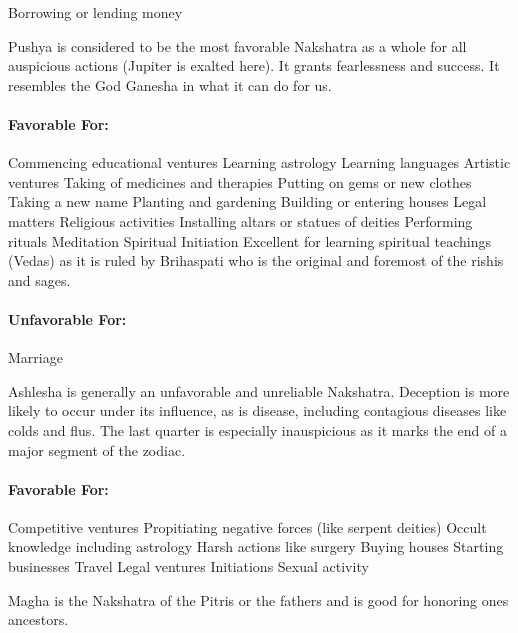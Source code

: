 Borrowing or lending money
 


Pushya is considered to be the most favorable Nakshatra as a whole for all auspicious actions (Jupiter is exalted here). It grants fearlessness and success. It resembles the God Ganesha in what it can do for us.

 

\paragraph{Favorable For:}

Commencing educational ventures
Learning astrology
Learning languages
Artistic ventures
Taking of medicines and therapies
Putting on gems or new clothes
Taking a new name
Planting and gardening
Building or entering houses
Legal matters
Religious activities
Installing altars or statues of deities
Performing rituals
Meditation
Spiritual Initiation
Excellent for learning spiritual teachings (Vedas) as it is ruled by Brihaspati who is the original and foremost of the rishis and sages.
 

\paragraph{Unfavorable For:}

Marriage
 


Ashlesha is generally an unfavorable and unreliable Nakshatra. Deception is more likely to occur under its influence, as is disease, including contagious diseases like colds and flus. The last quarter is especially inauspicious as it marks the end of a major segment of the zodiac.

 

\paragraph{Favorable For:}

Competitive ventures
Propitiating negative forces (like serpent deities)
Occult knowledge including astrology
Harsh actions like surgery
Buying houses
Starting businesses
Travel
Legal ventures
Initiations
Sexual activity
 


Magha is the Nakshatra of the Pitris or the fathers and is good for honoring ones ancestors.

